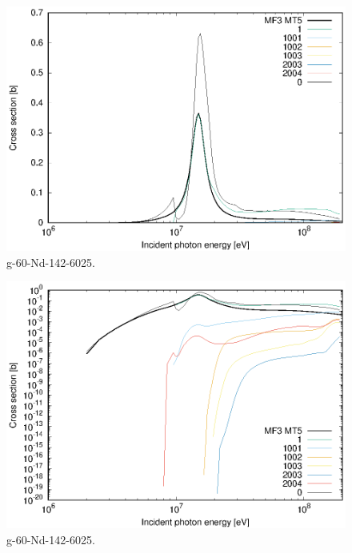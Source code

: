 \begin{figure}
 \includegraphics[width=\linewidth]{eps/g_60-Nd-142_6025.eps}
  \caption{g-60-Nd-142-6025.}
\end{figure}
\begin{figure}
 \includegraphics[width=\linewidth]{eps-log/g_60-Nd-142_6025.eps}
 \caption{g-60-Nd-142-6025.}
\end{figure}
\newpage \clearpage

